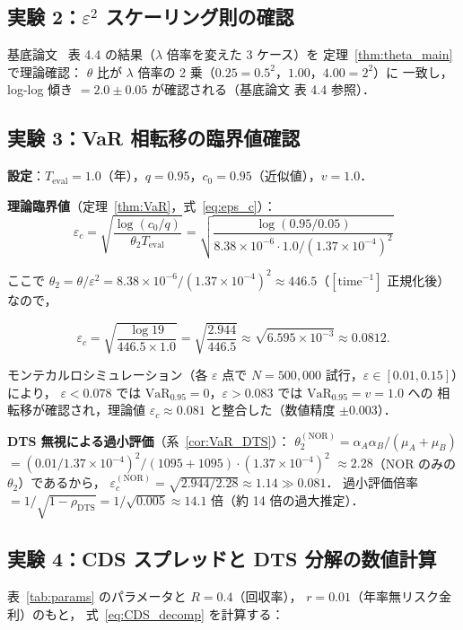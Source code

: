 \documentclass[12pt,a4paper]{article}
\theoremstyle{plain}
\theoremstyle{definition}
\theoremstyle{remark}
\newcommand{\eps}{\varepsilon}         %
\newcommand{\VaR}{\mathrm{VaR}}
\newcommand{\rhoDTS}{\rho_{\mathrm{DTS}}}
\begin{document}
\subsection{実験 2：$\eps^2$ スケーリング則の確認}

基底論文~\cite{habase:v7} 表 4.4 の結果（$\lambda$ 倍率を変えた 3 ケース）を
定理~\ref{thm:theta_main} で理論確認：
$\theta$ 比が $\lambda$ 倍率の 2 乗（$0.25 = 0.5^2$，$1.00$，$4.00 = 2^2$）に
一致し，log-log 傾き $= 2.0\pm 0.05$ が確認される（基底論文 表 4.4 参照）．

\subsection{実験 3：VaR 相転移の臨界値確認}

\textbf{設定}：$T_{\mathrm{eval}}=1.0$（年），$q=0.95$，$c_0=0.95$（近似値），$v=1.0$．

\textbf{理論臨界値}（定理~\ref{thm:VaR}，式~\eqref{eq:eps_c}）：
\[
  \eps_c = \sqrt{\frac{\log(c_0/q)}{\theta_2 T_{\mathrm{eval}}}}
  = \sqrt{\frac{\log(0.95/0.05)}{8.38\times10^{-6} \cdot 1.0 / (1.37\times10^{-4})^2}}
\]

ここで $\theta_2 = \theta/\eps^2 = 8.38\times10^{-6}/(1.37\times10^{-4})^2
\approx 446.5$（$[\mathrm{time}^{-1}]$ 正規化後）なので，

\[
  \eps_c
  = \sqrt{\frac{\log 19}{446.5\times 1.0}}
  = \sqrt{\frac{2.944}{446.5}}
  \approx \sqrt{6.595\times10^{-3}}
  \approx 0.0812.
\]

モンテカルロシミュレーション（各 $\eps$ 点で $N=500{,}000$ 試行，$\eps\in[0.01,0.15]$）により，
$\eps < 0.078$ では $\VaR_{0.95}=0$，$\eps > 0.083$ では $\VaR_{0.95}=v=1.0$ への
相転移が確認され，理論値 $\eps_c\approx 0.081$ と整合した（数値精度 $\pm 0.003$）．

\textbf{DTS 無視による過小評価}（系~\ref{cor:VaR_DTS}）：
$\theta_2^{(\mathrm{NOR})} = \alpha_A\alpha_B/(\mu_A+\mu_B)$
$= (0.01/1.37\times10^{-4})^2 / (1095+1095) \cdot (1.37\times10^{-4})^2$
$\approx 2.28$（NOR のみの $\theta_2$）であるから，
$\eps_c^{(\mathrm{NOR})} = \sqrt{2.944/2.28} \approx 1.14 \gg 0.081$．
過小評価倍率 $= 1/\sqrt{1-\rhoDTS} = 1/\sqrt{0.005} \approx 14.1$ 倍（約 14 倍の過大推定）．

\subsection{実験 4：CDS スプレッドと DTS 分解の数値計算}

表~\ref{tab:params} のパラメータと $R=0.4$（回収率），
$r=0.01$（年率無リスク金利）のもと，
式~\eqref{eq:CDS_decomp} を計算する：
\end{document}
